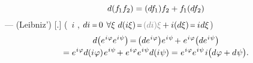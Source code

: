 \vspace{-0.1em}
%
\vspace{-0.5em}\begin{equation*}
d( f_{\hspace{-0.1ex}1} f_{2} ) = (d f_{\hspace{-0.1ex}1}) f_{2} + f_{\hspace{-0.1ex}1} (d f_{2})
\vspace{-0.5em}\end{equation*}
%
---
(Leibniz’) [.]
(~$i$
,
${di \hspace{.3ex} \narroweq \hspace{.2ex} 0}$
${ \forall \xi \hspace{.75ex} d(i \xi) \hspace{.1ex} \narroweq \hspace{.1ex} \mathcolor{gray}{(di) \xi} \hspace{-0.1ex} + i (d\xi) \hspace{.1ex} \narroweq \hspace{.3ex} i \hspace{.1ex} d\xi }$)
%
\vspace{-0.8em}\begin{multline*}
d \bigl( e^{\hspace{.1ex} i \hspace{.1ex} \varphi} e^{\hspace{.1ex} i \hspace{.1ex} \psi} \bigr) \hspace{-0.25ex}
= \hspace{-0.25ex} \bigl( d e^{\hspace{.1ex} i \hspace{.1ex} \varphi} \bigr) e^{\hspace{.1ex} i \hspace{.1ex} \psi} \hspace{-0.25ex}
+ \hspace{.1ex} e^{\hspace{.1ex} i \hspace{.1ex} \varphi} \bigl( d e^{\hspace{.1ex} i \hspace{.1ex} \psi} \bigr)
\\[-0.2em]
= e^{\hspace{.1ex} i \hspace{.1ex} \varphi} d(i \hspace{.1ex} \varphi) \hspace{.2ex} e^{\hspace{.1ex} i \hspace{.1ex} \psi} \hspace{-0.25ex}
+ \hspace{.1ex} e^{\hspace{.1ex} i \hspace{.1ex} \varphi} e^{\hspace{.1ex} i \hspace{.1ex} \psi} d(i \hspace{.1ex} \psi)
= \hspace{.1ex} e^{\hspace{.1ex} i \hspace{.1ex} \varphi} e^{\hspace{.1ex} i \hspace{.1ex} \psi} \hspace{.2ex} i \bigl( d \hspace{.1ex} \varphi + d \hspace{.1ex} \psi \bigr)
.
\end{multline*}

